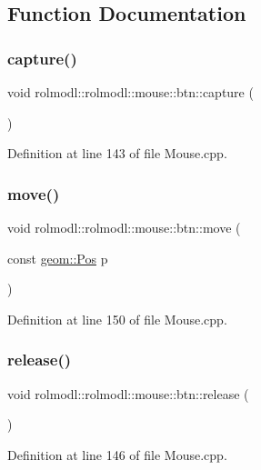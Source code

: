 \subsection{Function Documentation}
\mbox{\label{namespacerolmodl_1_1rolmodl_1_1mouse_1_1btn_a410d296f8902c2db116ce423ecdc5fc1}} 
\subsubsection{\texorpdfstring{capture()}{capture()}}
{\footnotesize\ttfamily void rolmodl\+::rolmodl\+::mouse\+::btn\+::capture (\begin{DoxyParamCaption}{ }\end{DoxyParamCaption})}



Definition at line 143 of file Mouse.\+cpp.

\mbox{\label{namespacerolmodl_1_1rolmodl_1_1mouse_1_1btn_a8aa0a0f0370d83af512990d3792306ee}} 
\subsubsection{\texorpdfstring{move()}{move()}}
{\footnotesize\ttfamily void rolmodl\+::rolmodl\+::mouse\+::btn\+::move (\begin{DoxyParamCaption}\item[{const \mbox{\hyperlink{structrolmodl_1_1geom_1_1_pos}{geom\+::\+Pos}}}]{p }\end{DoxyParamCaption})}



Definition at line 150 of file Mouse.\+cpp.

\mbox{\label{namespacerolmodl_1_1rolmodl_1_1mouse_1_1btn_a4fd3788e86fc36f3ced6e6600ac206ed}} 
\subsubsection{\texorpdfstring{release()}{release()}}
{\footnotesize\ttfamily void rolmodl\+::rolmodl\+::mouse\+::btn\+::release (\begin{DoxyParamCaption}{ }\end{DoxyParamCaption})}



Definition at line 146 of file Mouse.\+cpp.

